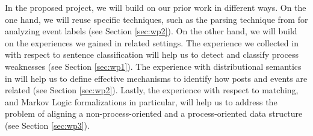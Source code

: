 In the proposed project, we will build on our prior work in different ways. On the one hand, we will reuse specific techniques, such as the parsing technique from \cite{leopold2019using} for analyzing event labels (see Section \ref{sec:wp2}). On the other hand, we will build on the experiences we gained in related settings. The experience we collected in \cite{van2017transforming} with respect to sentence classification will help us to detect and classify process weaknesses (see Section \ref{sec:wp1}). The experience with distributional semantics in \cite{leopold2015towards} will help us to define effective mechanisms to identify how posts and events are related (see Section \ref{sec:wp2}). Lastly, the experience with respect to matching, and Markov Logic formalizations in particular, will help us to address the problem of aligning a non-process-oriented and a process-oriented data structure (see Section \ref{sec:wp3}).  
